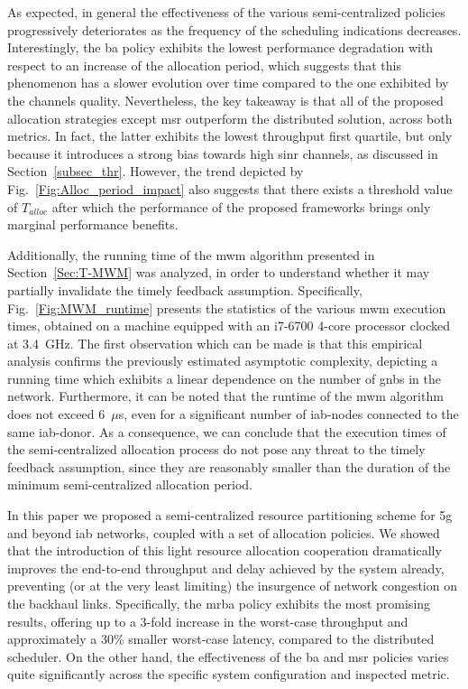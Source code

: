 As expected, in general the effectiveness of the various semi-centralized policies progressively deteriorates as the frequency of the scheduling indications decreases. Interestingly, the \gls{ba} policy exhibits the lowest performance degradation with respect to an increase of the allocation period, which suggests that this phenomenon has a slower evolution over time compared to the one exhibited by the channels quality. Nevertheless, the key takeaway is that all of the proposed allocation strategies except \gls{msr} outperform the distributed solution, across both metrics. In fact, the latter exhibits the lowest throughput first quartile, but only because it introduces a strong bias towards high \gls{sinr} channels, as discussed in Section~\ref{subsec_thr}. However, the trend depicted by Fig.~\ref{Fig:Alloc_period_impact} also suggests that there exists a threshold value of $T_{alloc}$ after which the performance of the proposed frameworks brings only marginal performance benefits.

Additionally, the running time of the \gls{mwm} algorithm presented in Section~\ref{Sec:T-MWM} was analyzed, in order to understand whether it may partially invalidate the timely feedback assumption. Specifically, Fig.~\ref{Fig:MWM_runtime} presents the statistics of the various \gls{mwm} execution times, obtained on a machine equipped with an i7-6700 4-core processor clocked at 3.4~{GHz}. 
The first observation which can be made is that this empirical analysis confirms the previously estimated asymptotic complexity, depicting a running time which exhibits a linear dependence on the number of \glspl{gnb} in the network. Furthermore, it can be noted that the runtime of the \gls{mwm} algorithm does not exceed 6~$\mu$s, even for a significant number of \gls{iab}-nodes connected to the same \gls{iab}-donor. As a consequence, we can conclude that the execution times of the semi-centralized allocation process do not pose any threat to the timely feedback assumption, since they are reasonably smaller than the duration of the minimum semi-centralized allocation period. 


In this paper we proposed a semi-centralized resource partitioning scheme for \gls{5g} and beyond \gls{iab} networks, coupled with a set of allocation policies. We showed that the introduction of this light resource allocation cooperation dramatically improves the end-to-end throughput and delay achieved by the system already, preventing (or at the very least limiting) the insurgence of network congestion on the backhaul links. Specifically, the \gls{mrba} policy exhibits the most promising results, offering up to a 3-fold increase in the worst-case throughput and approximately a 30\% smaller worst-case latency, compared to the distributed scheduler. On the other hand, the effectiveness of the \gls{ba} and \gls{msr} policies varies quite significantly across the specific system configuration and inspected metric. %

